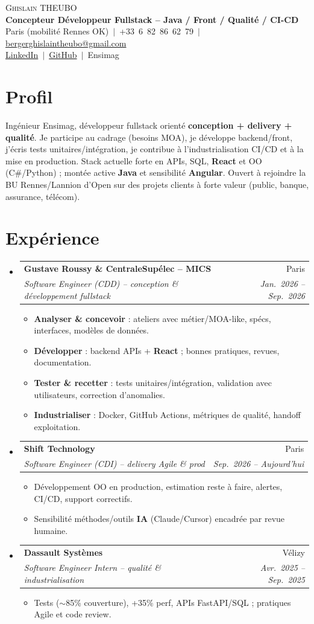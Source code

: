 \documentclass[a4paper,10.5pt]{article}
\makeatletter
\newcommand{\resumeItem}[1]{\item\small{#1}}
\newcommand{\resumeSubheading}[4]{\vspace{3pt}\item\begin{tabular*}{0.97\textwidth}[t]{l@{\extracolsep{\fill}}r}\textbf{#1}&{#2}\\\textit{\small #3}&\textit{\small #4}\\\end{tabular*}\vspace{1pt}}
\newcommand{\resumeSubHeadingListStart}{\begin{itemize}[leftmargin=0.08in,label={}]}
\newcommand{\resumeSubHeadingListEnd}{\end{itemize}}
\makeatother
\begin{document}
\begin{center}
{\Huge \scshape Ghislain THEUBO}\\[3pt]
\textbf{Concepteur D\'eveloppeur Fullstack -- Java / Front / Qualit\'e / CI-CD}\\[2pt]
\small Paris (mobilit\'e Rennes OK) $\,|\,$ +33~6~82~86~62~79 $\,|\,$ \href{mailto:bergerghislaintheubo@gmail.com}{bergerghislaintheubo@gmail.com}\\[1pt]
\href{https://www.linkedin.com/in/berger-ghislain}{LinkedIn} $\,|\,$ \href{https://github.com/Bergerghislain}{GitHub} $\,|\,$ Ensimag
\end{center}

\section{Profil}
\small{
Ing\'enieur Ensimag, d\'eveloppeur fullstack orient\'e \textbf{conception + delivery + qualit\'e}.
Je participe au cadrage (besoins MOA), je d\'eveloppe backend/front, j'\'ecris tests unitaires/int\'egration,
je contribue \`a l'industrialisation CI/CD et \`a la mise en production.
Stack actuelle forte en APIs, SQL, \textbf{React} et OO (C\#/Python) ; mont\'ee active \textbf{Java}
et sensibilit\'e \textbf{Angular}. Ouvert \`a rejoindre la BU Rennes/Lannion d'Open sur des projets
clients \`a forte valeur (public, banque, assurance, t\'el\'ecom).
}

\section{Exp\'erience}
\resumeSubHeadingListStart
  \resumeSubheading
    {Gustave Roussy \& CentraleSup\'elec -- MICS}{Paris}
    {Software Engineer (CDD) -- conception \& d\'eveloppement fullstack}{Jan.~2026 -- Sep.~2026}
    \begin{itemize}
      \resumeItem{\textbf{Analyser \& concevoir} : ateliers avec m\'etier/MOA-like, sp\'ecs, interfaces, mod\`eles de donn\'ees.}
      \resumeItem{\textbf{D\'evelopper} : backend APIs + \textbf{React} ; bonnes pratiques, revues, documentation.}
      \resumeItem{\textbf{Tester \& recetter} : tests unitaires/int\'egration, validation avec utilisateurs, correction d'anomalies.}
      \resumeItem{\textbf{Industrialiser} : Docker, GitHub Actions, m\'etriques de qualit\'e, handoff exploitation.}
    \end{itemize}
  \resumeSubheading
    {Shift Technology}{Paris}
    {Software Engineer (CDI) -- delivery Agile \& prod}{Sep.~2026 -- Aujourd'hui}
    \begin{itemize}
      \resumeItem{D\'eveloppement OO en production, estimation reste \`a faire, alertes, CI/CD, support correctifs.}
      \resumeItem{Sensibilit\'e m\'ethodes/outils \textbf{IA} (Claude/Cursor) encadr\'ee par revue humaine.}
    \end{itemize}
  \resumeSubheading
    {Dassault Syst\`emes}{V\'elizy}
    {Software Engineer Intern -- qualit\'e \& industrialisation}{Avr.~2025 -- Sep.~2025}
    \begin{itemize}
      \resumeItem{Tests ($\sim$85\% couverture), +35\% perf, APIs FastAPI/SQL ; pratiques Agile et code review.}
    \end{itemize}
\resumeSubHeadingListEnd
\end{document}

